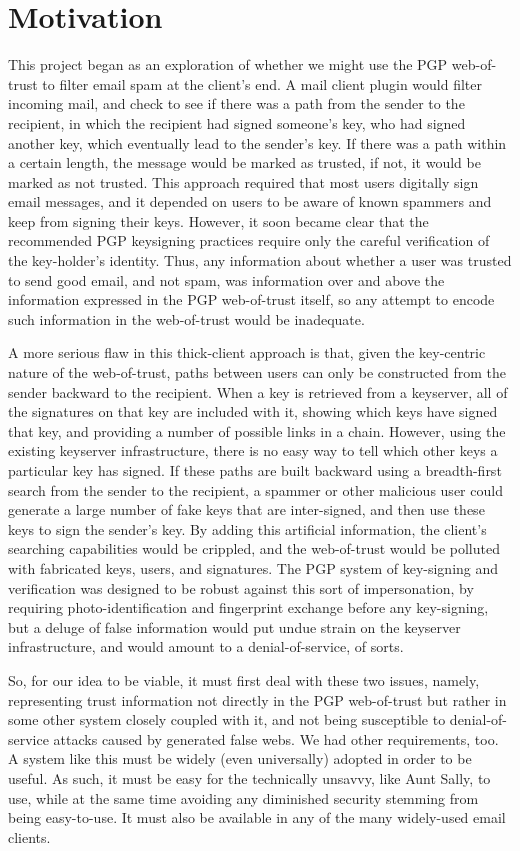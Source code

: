 \documentclass{acm_proc_article-sp}
\begin{document}
\section{Motivation}
This project began as an exploration of whether we might use the PGP web-of-trust to filter email spam at the client's end. A mail client plugin would filter incoming mail, and check to see if there was a path from the sender to the recipient, in which the recipient had signed someone's key, who had signed another key, which eventually lead to the sender's key. If there was a path within a certain length, the message would be marked as trusted, if not, it would be marked as not trusted. This approach required that most users digitally sign email messages, and it depended on users to be aware of known spammers and keep from signing their keys. However, it soon became clear that the recommended PGP keysigning practices require only the careful verification of the key-holder's identity. Thus, any information about whether a user was trusted to send good email, and not spam, was information over and above the information expressed in the PGP web-of-trust itself, so any attempt to encode such information in the web-of-trust would be inadequate.

A more serious flaw in this thick-client approach is that, given the key-centric nature of the web-of-trust, paths between users can only be constructed from the sender backward to the recipient. When a key is retrieved from a keyserver, all of the signatures on that key are included with it, showing which keys have signed that key, and providing a number of possible links in a chain. However, using the existing keyserver infrastructure, there is no easy way to tell which other keys a particular key has signed. If these paths are built backward using a breadth-first search from the sender to the recipient, a spammer or other malicious user could generate a large number of fake keys that are inter-signed, and then use these keys to sign the sender's key. By adding this artificial information, the client's searching capabilities would be crippled, and the web-of-trust would be polluted with fabricated keys, users, and signatures. The PGP system of key-signing and verification was designed to be robust against this sort of impersonation, by requiring photo-identification and fingerprint exchange before any key-signing, but a deluge of false information would put undue strain on the keyserver infrastructure, and would amount to a denial-of-service, of sorts.

So, for our idea to be viable, it must first deal with these two issues, namely, representing trust information not directly in the PGP web-of-trust but rather in some other system closely coupled with it, and not being susceptible to denial-of-service attacks caused by generated false webs. We had other requirements, too. A system like this must be widely (even universally) adopted in order to be useful. As such, it must be easy for the technically unsavvy, like Aunt Sally, to use, while at the same time avoiding any diminished security stemming from being easy-to-use. It must also be available in any of the many widely-used email clients. 
\end{document}
